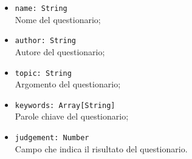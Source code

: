 \begin{itemize}
\begin{itemize}
			\begin{itemize}
				\item \texttt{name: String}\\ Nome del questionario;
				\item \texttt{author: String}\\ Autore del questionario;
				\item \texttt{topic: String}\\ Argomento del questionario;
				\item \texttt{keywords: Array[String]}\\ Parole chiave del questionario;
				\item \texttt{judgement: Number} \\ Campo che indica il risultato del questionario.
			\end{itemize}
		\end{itemize}
	\end{itemize}
	
		